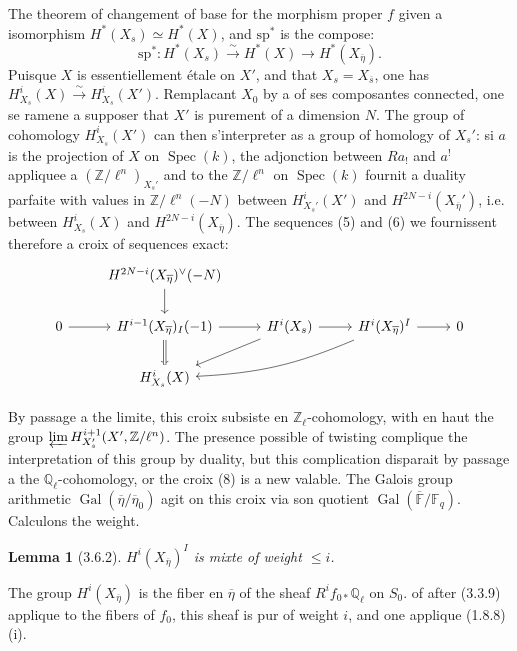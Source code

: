 \documentclass[12pt,a4paper]{article}
\theoremstyle{plain}
\newtheorem{lemma}[theorem]{Lemma}
\theoremstyle{definition}
\theoremstyle{remark}
\DeclareMathOperator{\Gal}{Gal}
\DeclareMathOperator{\Spec}{Spec}
\newcommand{\FF}{{\mathbb{F}}}
\newcommand{\QQ}{{\mathbb{Q}}}
\newcommand{\ZZ}{{\mathbb{Z}}}
\begin{document}
The theorem of changement of base for the morphism proper $f$ given a isomorphism $H^*(X_s) \simeq H^*(X)$, and $\mathrm{sp}^*$ is the compose:
\begin{equation}\label{eq:3.6.1.7}
\mathrm{sp}^* : H^*(X_s) \xrightarrow{\sim} H^*(X) \to H^*(X_{\overline{\eta}}).
\end{equation}
Puisque $X$ is essentiellement étale on $X'$, and that $X_s = X_{\overline{s}}$, one has $H_{X_s}^i(X) \xrightarrow{\sim} H_{X_s}^i(X')$. Remplacant $X_0$ by a of ses composantes connected, one se ramene a supposer that $X'$ is purement of a dimension $N$. The group of cohomology $H_{X_s}^i(X')$ can then s'interpreter as a group of homology of $X_s'$: si $a$ is the projection of $X$ on $\Spec(k)$, the adjonction between $Ra_!$ and $a^!$ appliquee a $(\ZZ/\ell^n)_{X_s'}$ and to the $\ZZ/\ell^n$ on $\Spec(k)$ fournit a duality parfaite with values in $\ZZ/\ell^n(-N)$ between $H_{X_s'}^i(X')$ and $H^{2N-i}(X_{\overline{\eta}}')$, i.e. between $H_{X_s}^i(X)$ and $H^{2N-i}(X_{\overline{\eta}})$. The sequences (5) and (6) we fournissent therefore a croix of sequences exact:
\begin{equation}\label{eq:3.6.1.8}
\begin{tikzcd}
& H^{2N-i}(X_{\overline{\eta}})^\vee(-N) \arrow[d] \\
0 \arrow[r] & H^{i-1}(X_{\overline{\eta}})_I(-1) \arrow[r] \arrow[d] & H^i(X_s) \arrow[r] \arrow[dl] & H^i(X_{\overline{\eta}})^I \arrow[r] \arrow[dll, bend left=10] & 0 \\
& H_{X_s}^i(X) \arrow[u, equal] & &
\end{tikzcd}
\end{equation}

By passage a the limite, this croix subsiste en $\ZZ_\ell$-cohomology, with en haut the group $\varprojlim H_{X_s'}^{i+1}(X', \ZZ/\ell^n)$. The presence possible of twisting complique the interpretation of this group by duality, but this complication disparait by passage a the $\QQ_\ell$-cohomology, or the croix (8) is a new valable. The Galois group arithmetic $\Gal(\overline{\eta}/\overline{\eta}_0)$ agit on this croix via son quotient $\Gal(\overline{\FF}/\FF_q)$. Calculons the weight.

\begin{lemma}[3.6.2]
$H^i(X_{\overline{\eta}})^I$ is mixte of weight $\leq i$.
\end{lemma}

The group $H^i(X_{\overline{\eta}})$ is the fiber en $\overline{\eta}$ of the sheaf $R^i f_{0*} \QQ_\ell$ on $S_0$. of after (3.3.9) applique to the fibers of $f_0$, this sheaf is pur of weight $i$, and one applique (1.8.8) (i).
\end{document}
